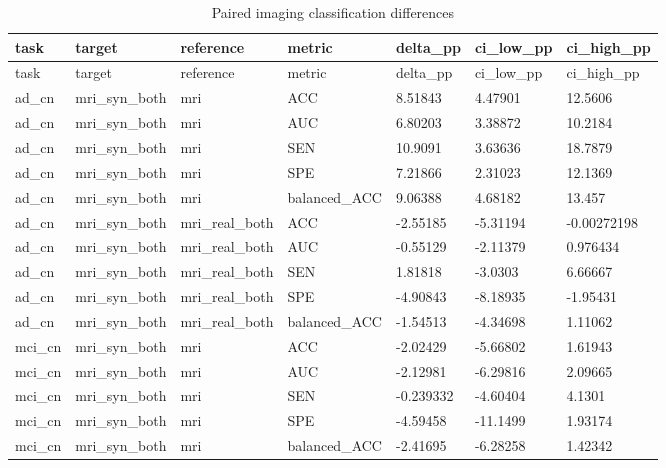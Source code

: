 \documentclass{article}
\begin{document}
\begin{landscape}
\begingroup
\footnotesize
\setlength{\tabcolsep}{4pt}
\begin{longtable}{lllllll}
\caption{{\color{blue}Paired imaging classification differences}}\label{tab:classification_comparisons}\\
\toprule
task & target & reference & metric & delta\_pp & ci\_low\_pp & ci\_high\_pp \\
\midrule
\endfirsthead
\toprule
task & target & reference & metric & delta\_pp & ci\_low\_pp & ci\_high\_pp \\
\midrule
\endhead
\bottomrule
\endfoot
ad\_cn & mri\_syn\_both & mri & ACC & 8.51843 & 4.47901 & 12.5606 \\
ad\_cn & mri\_syn\_both & mri & AUC & 6.80203 & 3.38872 & 10.2184 \\
ad\_cn & mri\_syn\_both & mri & SEN & 10.9091 & 3.63636 & 18.7879 \\
ad\_cn & mri\_syn\_both & mri & SPE & 7.21866 & 2.31023 & 12.1369 \\
ad\_cn & mri\_syn\_both & mri & balanced\_ACC & 9.06388 & 4.68182 & 13.457 \\
ad\_cn & mri\_syn\_both & mri\_real\_both & ACC & -2.55185 & -5.31194 & -0.00272198 \\
ad\_cn & mri\_syn\_both & mri\_real\_both & AUC & -0.55129 & -2.11379 & 0.976434 \\
ad\_cn & mri\_syn\_both & mri\_real\_both & SEN & 1.81818 & -3.0303 & 6.66667 \\
ad\_cn & mri\_syn\_both & mri\_real\_both & SPE & -4.90843 & -8.18935 & -1.95431 \\
ad\_cn & mri\_syn\_both & mri\_real\_both & balanced\_ACC & -1.54513 & -4.34698 & 1.11062 \\
mci\_cn & mri\_syn\_both & mri & ACC & -2.02429 & -5.66802 & 1.61943 \\
mci\_cn & mri\_syn\_both & mri & AUC & -2.12981 & -6.29816 & 2.09665 \\
mci\_cn & mri\_syn\_both & mri & SEN & -0.239332 & -4.60404 & 4.1301 \\
mci\_cn & mri\_syn\_both & mri & SPE & -4.59458 & -11.1499 & 1.93174 \\
mci\_cn & mri\_syn\_both & mri & balanced\_ACC & -2.41695 & -6.28258 & 1.42342 \\

\end{longtable}
\end{landscape}
\end{document}
